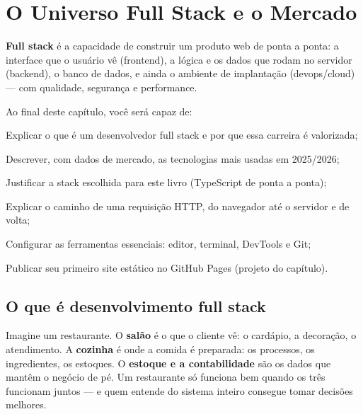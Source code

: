 \chapter{O Universo Full Stack e o Mercado}
\label{cap:universo}

\begin{caixaconceito}
\textbf{Full stack} é a capacidade de construir um produto web de ponta a
ponta: a interface que o usuário vê (frontend), a lógica e os dados que rodam
no servidor (backend), o banco de dados, e ainda o ambiente de implantação
(devops/cloud) — com qualidade, segurança e performance.
\end{caixaconceito}

Ao final deste capítulo, você será capaz de:
\begin{objetivos}
  \item Explicar o que é um desenvolvedor full stack e por que essa carreira é valorizada;
  \item Descrever, com dados de mercado, as tecnologias mais usadas em 2025/2026;
  \item Justificar a stack escolhida para este livro (TypeScript de ponta a ponta);
  \item Explicar o caminho de uma requisição HTTP, do navegador até o servidor e de volta;
  \item Configurar as ferramentas essenciais: editor, terminal, DevTools e Git;
  \item Publicar seu primeiro site estático no GitHub Pages (projeto do capítulo).
\end{objetivos}

\section{O que é desenvolvimento full stack}

Imagine um restaurante. O \textbf{salão} é o que o cliente vê: o cardápio, a
decoração, o atendimento. A \textbf{cozinha} é onde a comida é preparada: os
processos, os ingredientes, os estoques. O \textbf{estoque e a contabilidade}
são os dados que mantêm o negócio de pé. Um restaurante só funciona bem quando
os três funcionam juntos — e quem entende do sistema inteiro consegue tomar
decisões melhores.

